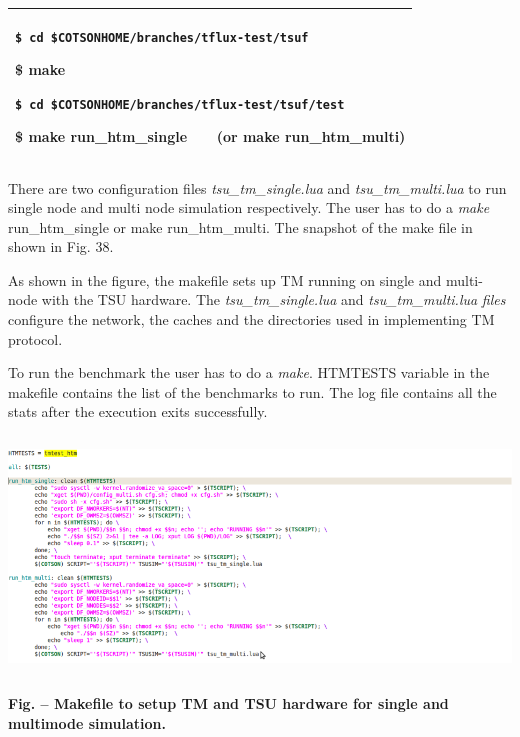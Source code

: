 \documentclass[a4paper]{article}
\newcounter{Figure}
\renewcommand\theFigure{\arabic{Figure}}
\begin{document}
\begin{flushleft}
\tablehead{}
\begin{supertabular}{|m{6.29346in}|}
\hline
{ \texttt{\$ cd
\$COTSONHOME/branches/tflux-test/tsuf}}

{\ttfamily \$ make}

{ \texttt{\$ cd
\$COTSONHOME/branches/tflux-test/tsuf/test}}

\ttfamily \$ make run\_htm\_single \ \ \ (or
make run\_htm\_multi)\\\hline
\end{supertabular}
\end{flushleft}
{
There are two configuration files \textit{tsu\_tm\_single.lua} and
\textit{tsu\_tm\_multi.lua}\textbf{\textit{ }}to run single node and
multi node simulation respectively. The user has to do a \textit{make}
run\_htm\_single or make run\_htm\_multi. The snapshot of the make file
in shown in Fig. 38.}

{
As shown in the figure, the makefile sets up TM running on single and
multi-node with the TSU hardware. The \textit{tsu\_tm\_single.lua} and
\textit{tsu\_tm\_multi.lua}\textbf{\textit{ }}\textit{files }configure
the network, the caches and the directories used in implementing TM
protocol.}

{
To run the benchmark the user has to do a \textit{make}. HTMTESTS
variable in the makefile contains the list of the benchmarks to run.
The log file contains all the stats after the execution exits
successfully.}

{\centering 
\includegraphics[width=5.8965in,height=2.4984in]{img54.png}
\par}

{\centering{}\sffamily\bfseries
\label{bkm:Ref388170927}Fig.
\stepcounter{Figure}{\theFigure} -- Makefile to setup TM and TSU
hardware for single and multimode simulation.
\par}
\end{document}
